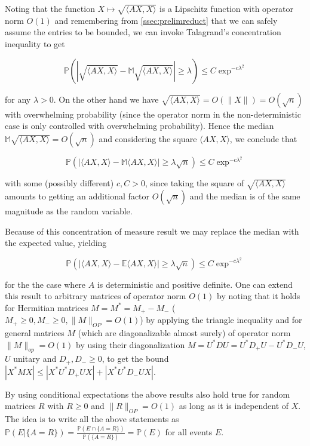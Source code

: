 Noting that the function $X\mapsto \sqrt{\langle AX,X\rangle}$ is a Lipschitz function with operator norm $O(1)$ and remembering from \ref{ssec:prelimreduct} that we can safely assume the entries to be bounded, we can invoke Talagrand's concentration inequality to get 

$$\mathbb P(|\sqrt{\langle AX,X\rangle}-\mathbb M\sqrt{\langle AX,X\rangle}|\geq\lambda)\leq C\exp^{-c\lambda^2}$$

for any $\lambda>0$. On the other hand we have $\sqrt{\langle AX,X\rangle}=O(\|X\|)=O(\sqrt n)$ with overwhelming probability (since the operator norm in the non-deterministic case is only controlled with overwhelming probability). Hence the median $\mathbb M\sqrt{\langle AX,X\rangle}=O(\sqrt n)$ and considering the square $\langle AX,X\rangle$, we conclude that

$$\mathbb P(|\langle AX,X\rangle-\mathbb M\langle AX,X\rangle|\geq\lambda\sqrt n)\leq C\exp^{-c\lambda^2}$$

with some (possibly different) $c,C>0$, since taking the square of $\sqrt{\langle AX,X\rangle}$ amounts to getting an additional factor $O(\sqrt n)$ and the median is of the same magnitude as the random variable.

Because of this concentration of measure result we may replace the median with the expected value, yielding

\begin{equation}\label{eq:concentrationOfXRXAroundTrR}
	\mathbb P(|\langle AX,X\rangle-\mathbb E\langle AX,X\rangle|\geq\lambda\sqrt n)\leq C\exp^{-c\lambda^2}
\end{equation}

for the the case where $A$ is deterministic and positive definite. One can extend this result to arbitrary matrices of operator norm $O(1)$ by noting that it holds for Hermitian matrices $M=M^*=M_+-M_-$ ($M_+\geq 0,M_-\geq 0,\|M\|_{OP}=O(1)$) by applying the triangle inequality and for general matrices $M$ (which are diagonalizable almost surely) of operator norm $\|M\|_{op}=O(1)$ by using their diagonalization $M=U^*DU=U^*D_+U-U^*D_-U$, $U$ unitary and $D_+,D_-\geq 0$, to get the bound $|X^*MX|\leq|X^*U^*D_+UX|+|X^*U^*D_-UX|$.

\begin{remark}\label{rem:conditionalExpectationForDeterministicResult}
	By using conditional expectations the above results also hold true for random matrices $R$ with $R\geq 0$ and $\|R\|_{OP}=O(1)$ as long as it is independent of $X$. The idea is to write all the above statements as $\mathbb P(E|\{A=R\})=\frac{\mathbb P(E\cap\{A=R\})}{\mathbb P(\{A=R\})}=\mathbb P(E)$ for all events $E$.
\end{remark}

